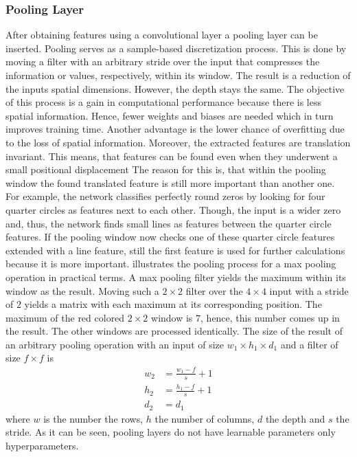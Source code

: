\subsubsection{Pooling Layer}
\label{sec:cnn-pooling-layer}
After obtaining features using a convolutional layer a pooling layer can be inserted.
Pooling serves as a sample-based discretization process.
This is done by moving a filter with an arbitrary stride over the input that compresses the information or values, respectively, within its window.
The result is a reduction of the inputs spatial dimensions.
However, the depth stays the same.
The objective of this process is a gain in computational performance because there is less spatial information.
Hence, fewer weights and biases are needed which in turn improves training time.
Another advantage is the lower chance of overfitting due to the loss of spatial information.
Moreover, the extracted features are translation invariant.
This means, that features can be found even when they underwent a small positional displacement
The reason for this is, that within the pooling window the found translated feature is still more important than another one.
For example, the network classifies perfectly round zeros by looking for four quarter circles as features next to each other.
Though, the input is a wider zero and, thus, the network finds small lines as features between the quarter circle features.
If the pooling window now checks one of these quarter circle features extended with a line feature, still the first feature is used for further calculations because it is more important.
 illustrates the pooling process for a max pooling operation in practical terms.
A max pooling filter yields the maximum within its window as the result.
Moving such a $2 \times 2$ filter over the $4 \times 4$ input with a stride of $2$ yields a matrix with each maximum at its corresponding position.
The maximum of the red colored $2 \times 2$ window is 7, hence, this number comes up in the result.
The other windows are processed identically.
The size of the result of an arbitrary pooling operation with an input of size $w_1 \times h_1 \times d_1$ and a filter of size $f \times f$ is
\begin{align}
	w_2 &= \frac{w_1 - f}{s}+1 \\
	h_2 &= \frac{h_1 - f}{s}+1 \\
	d_2 &= d_1
\end{align}
where $w$ is the number the rows, $h$ the number of columns, $d$ the depth and $s$ the stride.
As it can be seen, pooling layers do not have learnable parameters only hyperparameters.
